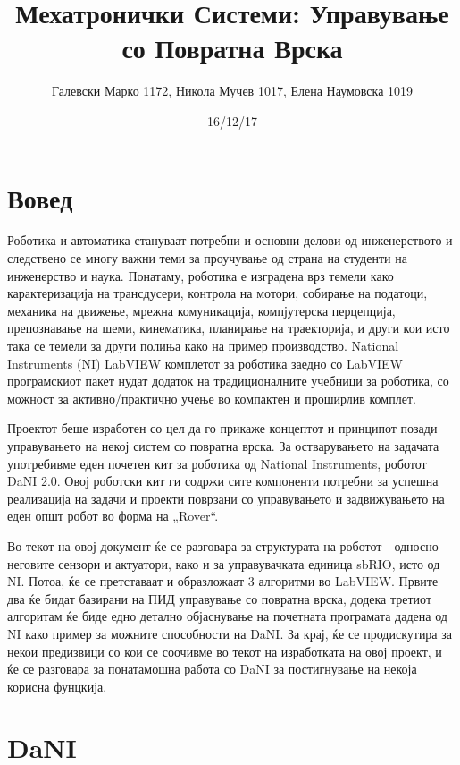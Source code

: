 \documentclass{article}
\title{Мехатронички Системи: Управување со Повратна Врска}
\date{16/12/17}
\author{Галевски Марко 1172, Никола Мучев 1017, Елена Наумовска 1019}
\begin{document}
    \maketitle{}
    \newpage
    \tableofcontents
    \newpage

\section{Вовед}
Роботика и автоматика стануваат потребни и основни делови од инженерството и следствено се многу важни теми за проучување од страна на студенти на инженерство и наука. Понатаму, роботика е изградена врз темели како карактеризација на трансдусери, контрола на мотори, собирање на податоци, механика на движење, мрежна комуникација, компјутерска перцепција, препознавање на шеми, кинематика, планирање на траекторија, и други кои исто така се темели за други полиња како на пример производство. National Instruments (NI) LabVIEW комплетот за роботика заедно со LabVIEW програмскиот пакет нудат додаток на традиционалните учебници за роботика, со можност за активно/практично учење во компактен и проширлив комплет.

Проектот беше изработен со цел да го прикаже концептот и принципот позади управувањето на некој систем со повратна врска. За остварувањето на задачата употребивме еден почетен кит за роботика од National Instruments, роботот DaNI 2.0. Овој роботски кит ги содржи сите компоненти потребни за успешна реализација на задачи и проекти поврзани со управувањето и задвижувањето на еден општ робот во форма на „Rover“. 

Во текот на овој документ ќе се разговара за структурата на роботот - односно неговите сензори и актуатори, како и за управувачката единица sbRIO, исто од NI. Потоа, ќе се претставаат и образложаат 3 алгоритми во LabVIEW. Првите два ќе бидат базирани на ПИД управување со повратна врска, додека третиот алгоритам ќе биде едно детално објаснување на почетната програмата дадена од NI како пример за можните способности на DaNI. За крај, ќе се продискутира за некои предизвици со кои се соочивме во текот на изработката на овој проект, и ќе се разговара за понатамошна работа со DaNI за постигнување на некоја корисна фунцкија.
\newpage
\section{DaNI}
\end{document}
